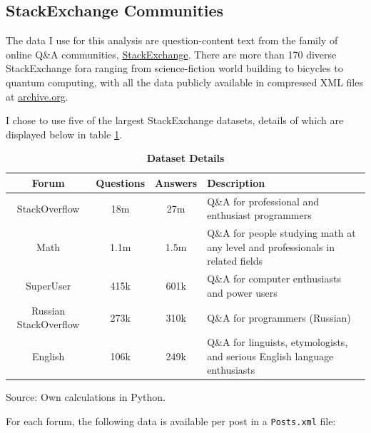 \documentclass[11pt,preprint, authoryear]{article}
\numberwithin{equation}{section}
\numberwithin{figure}{section}
\numberwithin{table}{section}
\begin{document}
\subsection{StackExchange Communities}\label{stackexchange-communities}

The data I use for this analysis are question-content text from the
family of online Q\&A communities,
\href{https://stackexchange.com/sites\#traffic}{StackExchange}. There
are more than 170 diverse StackExchange fora ranging from
science-fiction world building to bicycles to quantum computing, with
all the data publicly available in compressed XML files at
\href{http://archive.org/download/stackexchange}{archive.org}.

I chose to use five of the largest StackExchange datasets, details of
which are displayed below in table \ref{tab:fora}.

\renewcommand{\thetable}{\arabic{table}}

\footnotesize

\begin{longtable} {@{} cccp{12cm} @{}}
\caption{\textbf{Dataset Details}}
\label{tab:fora}\\ \hline \hline
Forum & Questions & Answers & Description \\ 
\hline
StackOverflow & 18m & 27m & Q\&A for professional and enthusiast programmers \\
Math & 1.1m & 1.5m & Q\&A for people studying math at any level and professionals in related fields \\
SuperUser & 415k & 601k & Q\&A for computer enthusiasts and power users \\ 
Russian StackOverflow & 273k & 310k & Q\&A for programmers (Russian) \\ 
English & 106k & 249k & Q\&A for linguists, etymologists, and serious English language enthusiasts \\ 
\hline \hline
\end{longtable}\begin{center} Source: Own calculations in Python.\end{center}

\normalsize

For each forum, the following data is available per post in a
\texttt{Posts.xml} file:

\end{document}
